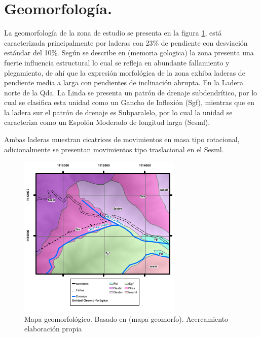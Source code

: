 \section{Geomorfolog\'{i}a.}
La geomorfolog\'{i}a de la zona de estudio se presenta en la figura \ref{fig:mapageomorfo}, est\'{a} caracterizada principalmente por laderas con 23\% de pendiente con desviaci\'{o}n est\'{a}ndar del 10\%.
Seg\'{u}n se describe en (memoria gologica) la zona presenta una fuerte influencia estructural lo cual se refleja en abundante fallamiento y plegamiento, de ah\'i que la expresi\'{o}n morfol\'{o}gica de la zona exhiba laderas de pendiente media a larga con pendientes de inclinaci\'{o}n abrupta. En la Ladera norte de la Qda. La Linda se presenta un patr\'{o}n de drenaje subdendr\'{i}tico, por lo cual se clasifica esta unidad como un Gancho de Inflexi\'{o}n (Sgf), mientras que en la ladera sur el patr\'{o}n de drenaje es Subparalelo, por lo cual la unidad se caracteriza como un Espol\'{o}n Moderado de longitud larga (Sesml).\par
Ambas laderas muestran cicatrices de movimientos en masa tipo rotacional, adicionalmente se presentan movimientos tipo traslacional en el Sesml. 
 \par


\begin{figure}[H]
\centering

\includegraphics[width=.8\textwidth]{img/geomorfo.pdf}
\caption{Mapa geomorfol\'{o}gico. Basado en (mapa geomorfo). Acercamiento elaboraci\'on propia}

\label{fig:mapageomorfo}
\end{figure}